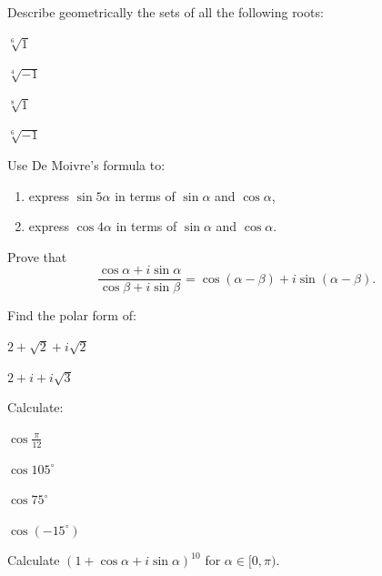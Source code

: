 \begin{exercise}
Describe geometrically the sets of all the following roots:
\begin{enumerate*}[label=\alph*), itemjoin={\qquad}]
\item $\sqrt[6]{1}$
\item $\sqrt[4]{-1}$
\item $\sqrt[8]{1}$
\item $\sqrt[6]{-1}$
\end{enumerate*}
\end{exercise}

\begin{exercise}
Use De Moivre's formula to:
\begin{enumerate}[label=(\alph*)]
\item express $\sin 5\alpha$ in terms of $\sin\alpha$ and $\cos\alpha$,
\item express $\cos 4\alpha$ in terms of $\sin\alpha$ and $\cos\alpha$.
\end{enumerate}
\end{exercise}

\begin{exercise}
Prove that
\[
\frac{\cos\alpha + i \sin\alpha}{\cos\beta + i\sin\beta} = \cos(\alpha-\beta) + i \sin(\alpha - \beta).
\]
\end{exercise}

\begin{exercise}
Find the polar form of:
\begin{enumerate*}[label=\alph*), itemjoin={\qquad}]
\item $2+\sqrt2 + i \sqrt 2$
\item $2 + i + i\sqrt3$
\end{enumerate*}
\end{exercise}

\begin{exercise}
Calculate:
\begin{enumerate*}[label=\alph*), itemjoin={\qquad}]
\item $\cos\tfrac{\pi}{12}$
\item $\cos 105^\circ$
\item $\cos 75^\circ$
\item $\cos(-15^\circ)$
\end{enumerate*}
\end{exercise}

\begin{exercise}
Calculate $(1+\cos\alpha+i\sin\alpha)^{10}$ for $\alpha\in [0,\pi)$.
\end{exercise}

